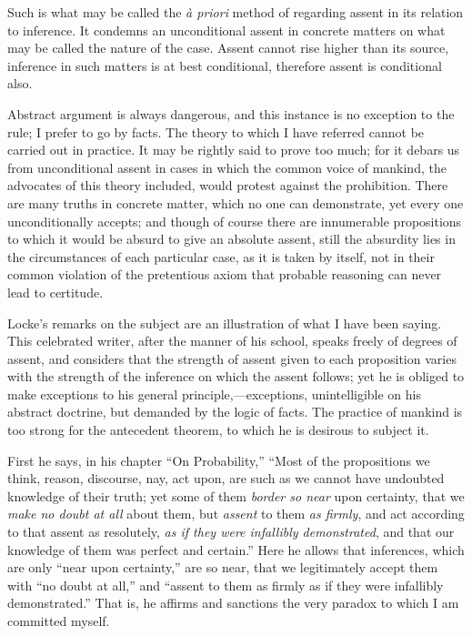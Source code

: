 Such is what may be called the \emph{à priori} method of regarding
assent in its relation to inference. It condemns an
unconditional assent in concrete matters on what may be called the
nature of the case. Assent cannot rise higher than its source,
inference in such matters is at best conditional, therefore assent is
conditional also.

Abstract argument is always dangerous, and this instance is no
exception to the rule; I prefer to go by facts. The theory to which I
have referred cannot be carried out in practice. It may be rightly
said to prove too much; for it debars us from unconditional assent in
cases in which the common voice of mankind, the advocates of this
theory included, would protest against the prohibition. There are many
truths in concrete matter, which no one can demonstrate, yet every one
unconditionally accepts; and though of course there are innumerable
propositions to which it would be absurd to give an absolute assent,
still the absurdity lies in the circumstances of each particular case,
as it is taken by itself, not in their common violation of the
pretentious axiom that probable reasoning can never lead to certitude.

Locke's remarks on the subject are an illustration of what I have
been saying. This celebrated writer, after the manner of his school,
speaks freely of degrees of assent, and considers that the strength of
assent given to each proposition varies with the strength of the
inference on which the assent follows; yet he is obliged to make
exceptions to his general principle,—exceptions, unintelligible on
his abstract doctrine, but demanded by the logic of facts. The
practice of mankind is too strong for the antecedent theorem, to which
he is desirous to subject it.

First he says, in his chapter ``On Probability,''
``Most of the propositions we think, reason, discourse, nay, act
upon, are such as we cannot have undoubted knowledge of their truth;
yet some of them \emph{border so near} upon certainty, that we \emph{make
no doubt at all} about them, but \emph{assent} to them \emph{as firmly},
and act according to that assent as resolutely, \emph{as if they were
infallibly demonstrated}, and that our knowledge of them was
perfect and certain.'' Here he allows that inferences, which are
only ``near upon certainty,'' are so near, that we
legitimately accept them with ``no doubt at all,'' and
``assent to them as firmly as if they were infallibly
demonstrated.'' That is, he affirms and sanctions the very paradox
to which I am committed myself.

